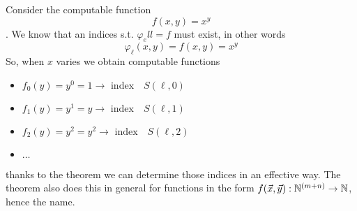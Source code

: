 \begin{example}
  Consider the computable function \[f(x,y) = x^y\]. We know that an
  indices s.t. \(\varphi_ell = f\) must exist, in other
  words \[\varphi_\ell(x,y) = f(x,y) = x^y\] So, when $x$ varies we
  obtain computable functions
  \begin{itemize}
  \item[] \(f_0(y) = y^0 = 1 \rightarrow \mbox{ index} \quad S(\ell,0)\)
  \item[] \(f_1(y) = y^1 = y \rightarrow \mbox{ index} \quad S(\ell,1)\)
  \item[] \(f_2(y) = y^2 = y^2 \rightarrow \mbox{ index} \quad S(\ell,2)\)
  \item[] \(\dots\)
  \end{itemize}
  thanks to the \smn theorem we can determine those indices in an
  effective way. The theorem also does this in general for functions
  in the form $f(\vec{x}, \vec{y}) : \mathbb{N}^{(m+n)} \rightarrow \mathbb{N}$,
  hence the name.
\end{example}


